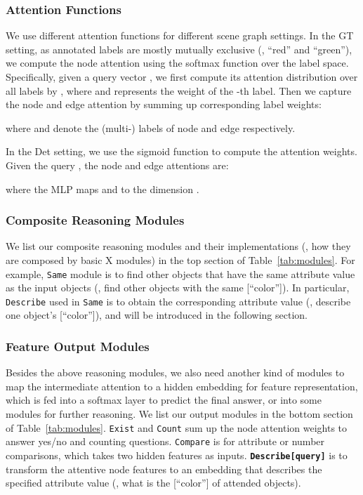 \documentclass[10pt,twocolumn,letterpaper]{article}
\begin{document}
\vspace{-0.2cm}
\subsubsection{Attention Functions}
We use different attention functions for different scene graph settings.
In the GT setting, as annotated labels are mostly mutually exclusive (\eg, ``red'' and ``green''), we compute the node attention using the softmax function over the label space.
Specifically, given a query vector , we first compute its attention distribution over all labels by , where  and  represents the weight of the -th label.
Then we capture the node and edge attention by summing up corresponding label weights:

where  and  denote the (multi-) labels of node  and edge  respectively.


In the Det setting, we use the sigmoid function to compute the attention weights.
Given the query , the node and edge attentions are:

where the MLP maps  and  to the dimension .




\vspace{-0.3cm}
\subsubsection{Composite Reasoning Modules}
We list our composite reasoning modules and their implementations (\ie, how they are composed by basic X modules) in the top section of Table~\ref{tab:modules}. For example, \texttt{Same} module is to find other objects that have the same attribute value as the input objects (\eg, find other objects with the same [``color'']).  In particular, \texttt{Describe} used in \texttt{Same} is to obtain the corresponding attribute value (\eg, describe one object's [``color'']), and will be introduced in the following section.


\vspace{-0.3cm}
\subsubsection{Feature Output Modules}
Besides the above reasoning modules, we also need another kind of modules to map the intermediate attention to a hidden embedding  for feature representation, which is fed into a softmax layer to predict the final answer, or into some modules for further reasoning.
We list our output modules in the bottom section of Table~\ref{tab:modules}.
\texttt{Exist} and \texttt{Count} sum up the node attention weights to answer yes/no and counting questions.
\texttt{Compare} is for attribute or number comparisons, which takes two hidden features as inputs.
\textbf{\texttt{Describe[query]}} is to transform the attentive node features to an embedding that describes the specified attribute value (\eg, what is the [``color''] of attended objects).
\end{document}
